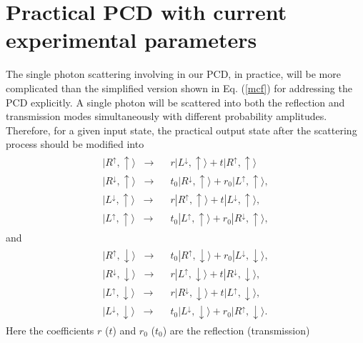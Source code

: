 \documentclass[aps,graphicx,twocolumn]{revtex4}%
\begin{document}
\section{Practical PCD with current experimental parameters}
The single photon scattering involving in our PCD, in practice, will be more complicated than the simplified version shown in Eq. (\ref{mcf}) for addressing the PCD explicitly. A single photon will be scattered into both the reflection and transmission modes simultaneously with different probability amplitudes. Therefore, for a given input state, the practical output state after the scattering process should be modified into \cite{QR1,QR2}
\begin{eqnarray}%
\begin{split}
|R^{\uparrow},\uparrow\rangle \;\; \rightarrow  \;\;&
r|L^{\downarrow},\uparrow\rangle+t|R^{\uparrow},\uparrow\rangle \\
|R^{\downarrow},\uparrow\rangle  \;\; \rightarrow  \;\;&  t_0|R^{\downarrow},\uparrow\rangle+r_0|L^{\uparrow},\uparrow\rangle, \\
|L^{\downarrow},\uparrow\rangle   \;\; \rightarrow  \;\;&
r|R^{\uparrow},\uparrow\rangle+t|L^{\downarrow},\uparrow\rangle, \\
|L^{\uparrow},\uparrow\rangle  \;\; \rightarrow  \;\;&
t_0|L^{\uparrow},\uparrow\rangle+r_0|R^{\downarrow},\uparrow\rangle,
\label{transuppp}
\end{split}
\end{eqnarray}
and
\begin{eqnarray}%
\begin{split}
|R^{\uparrow},\downarrow\rangle  \;\; \rightarrow  \;\;&
t_0|R^{\uparrow},\downarrow\rangle+r_0|L^{\downarrow},\downarrow\rangle, \\
|R^{\downarrow},\downarrow\rangle  \;\; \rightarrow  \;\;&
r|L^{\uparrow},\downarrow\rangle+t|R^{\downarrow},\downarrow\rangle, \\
|L^{\uparrow},\downarrow\rangle  \;\; \rightarrow  \;\;&
r|R^{\downarrow},\downarrow\rangle+t|L^{\uparrow},\downarrow\rangle, \\
|L^{\downarrow},\downarrow\rangle  \;\; \rightarrow  \;\;&
t_0|L^{\downarrow},\downarrow\rangle+r_0|R^{\uparrow},\downarrow\rangle.
\label{transdownpp}
\end{split}
\end{eqnarray}
Here the coefficients $r$ ($t$) and $r_0$ ($t_0$) are the reflection (transmission)
\end{document}
